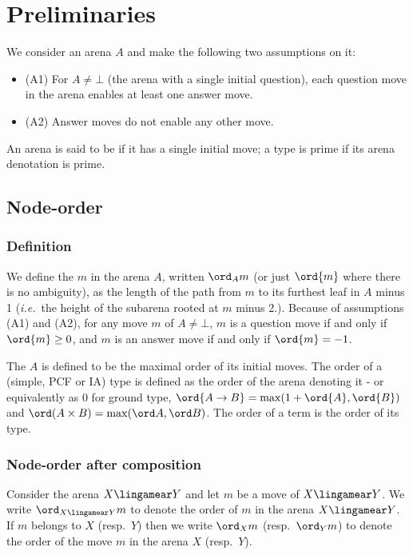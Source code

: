 \label{chap:pincrjust}

\section{Preliminaries}

We consider an arena $A$ and make the following two assumptions on it:
\begin{itemize}
\item (A1) For $A \neq \bot$ (the arena with a single initial question), each question move in the arena enables at least one answer move.
\item (A2) Answer moves do not enable any other move.
\end{itemize}

An arena is said to be  if it has a single initial move; a type is prime if its arena denotation is prime.

\subsection{Node-order}

\subsubsection{Definition}

We define the  $m$ in the arena $A$, written $\ord_A{m}$ (or just $\ord{m}$ where there is no ambiguity), as the length of the path from $m$ to its furthest leaf in $A$ minus 1
({\it i.e.}~the height of the subarena rooted at $m$ minus 2.). Because of assumptions (A1) and (A2),
for any move $m$ of $A \neq \bot$, $m$ is a question move if and only if $\ord{m} \geq 0$, and $m$ is an answer move if and only if $\ord{m} = -1$.

The  $A$ is defined to be the maximal order of its initial moves. The order of a (simple, PCF or IA) type is defined as the order of the arena denoting it - or equivalently as 0 for ground type, $\ord{A\rightarrow B} = \max(1+\ord{A},\ord{B})$ and $\ord(A\times B) = \max(\ord A, \ord B)$. The order of a term is the order of its type.


\subsubsection{Node-order after composition}

Consider the arena $X\lingamear Y$ and let $m$ be a move of
$X\lingamear Y$. We write $\ord_{X\lingamear Y}{m}$ to denote the
order of $m$ in the arena ${X\lingamear Y}$. If $m$ belongs to $X$
(resp.~$Y$) then we write $\ord_X{m}$ (resp.~$\ord_Y{m}$) to denote
the order of the move $m$ in the arena $X$ (resp.~$Y$).

